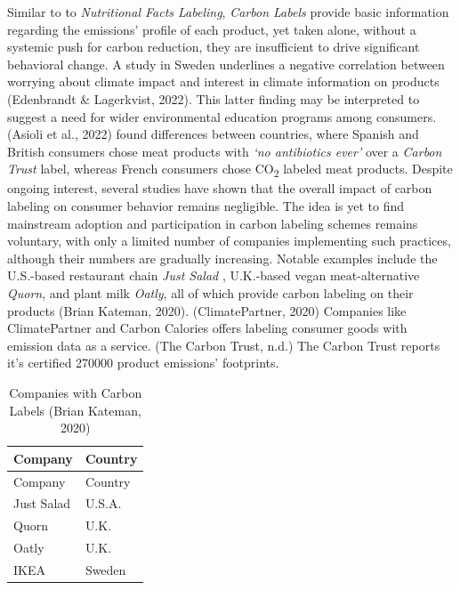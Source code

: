 \documentclass[
  12pt,
  letterpaper,
  DIV=11,
  numbers=noendperiod]{scrartcl}
\begin{document}
Similar to to \emph{Nutritional Facts Labeling}, \emph{Carbon Labels}
provide basic information regarding the emissions' profile of each
product, yet taken alone, without a systemic push for carbon reduction,
they are insufficient to drive significant behavioral change. A study in
Sweden underlines a negative correlation between worrying about climate
impact and interest in climate information on products (Edenbrandt \&
Lagerkvist, 2022). This latter finding may be interpreted to suggest a
need for wider environmental education programs among consumers. (Asioli
et al., 2022) found differences between countries, where Spanish and
British consumers chose meat products with \emph{`no antibiotics ever'}
over a \emph{Carbon Trust} label, whereas French consumers chose
CO\textsubscript{2} labeled meat products. Despite ongoing interest,
several studies have shown that the overall impact of carbon labeling on
consumer behavior remains negligible. The idea is yet to find mainstream
adoption and participation in carbon labeling schemes remains voluntary,
with only a limited number of companies implementing such practices,
although their numbers are gradually increasing. Notable examples
include the U.S.-based restaurant chain \emph{Just Salad} , U.K.-based
vegan meat-alternative \emph{Quorn}, and plant milk \emph{Oatly}, all of
which provide carbon labeling on their products (Brian Kateman, 2020).
(ClimatePartner, 2020) Companies like ClimatePartner and Carbon Calories
offers labeling consumer goods with emission data as a service. (The
Carbon Trust, n.d.) The Carbon Trust reports it's certified 270000
product emissions' footprints.

\def\pandoctableshortcapt{Companies With Carbon Labels}

\begin{longtable}[]{@{}ll@{}}
\caption[Companies With Carbon Labels]{Companies with Carbon Labels
(Brian Kateman, 2020)}\tabularnewline
\toprule\noalign{}
Company & Country \\
\midrule\noalign{}
\endfirsthead
\toprule\noalign{}
Company & Country \\
\midrule\noalign{}
\endhead
\bottomrule\noalign{}
\endlastfoot
Just Salad & U.S.A. \\
Quorn & U.K. \\
Oatly & U.K. \\
IKEA & Sweden \\
\end{longtable}

\let\pandoctableshortcapt\relax
\end{document}

